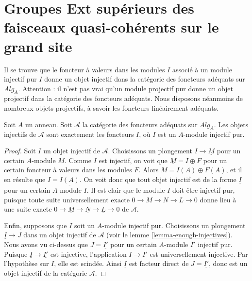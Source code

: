 \section{Groupes Ext supérieurs des faisceaux quasi-cohérents sur le grand site}
\label{section-big}

\noindent
Il se trouve que le foncteur à valeurs dans les modules $\underline{I}$ associé à
un module injectif pur $I$ donne un objet injectif dans la
catégorie des foncteurs adéquats sur $\textit{Alg}_A$.
Attention : il n'est pas vrai qu'un module projectif pur donne
un objet projectif dans la catégorie des foncteurs adéquats. Nous disposons néanmoins
de nombreux objets projectifs, à savoir les foncteurs linéairement adéquats.

\begin{lemma}
\label{lemma-pure-injective-injective-adequate}
Soit $A$ un anneau.
Soit $\mathcal{A}$ la catégorie des foncteurs adéquats sur $\textit{Alg}_A$.
Les objets injectifs de $\mathcal{A}$ sont exactement les foncteurs
$\underline{I}$, où $I$ est un $A$-module injectif pur.
\end{lemma}

\begin{proof}
Soit $I$ un objet injectif de $\mathcal{A}$.
Choisissons un plongement $I \to \underline{M}$ pour un certain $A$-module $M$.
Comme $I$ est injectif, on voit que $\underline{M} = I \oplus F$ pour un certain
foncteur à valeurs dans les modules $F$. Alors $M = I(A) \oplus F(A)$, et il en résulte
que $I = \underline{I(A)}$. On voit donc que tout objet injectif
est de la forme $\underline{I}$ pour un certain $A$-module $I$.
Il est clair que le module $I$ doit être injectif pur,
puisque toute suite universellement exacte $0 \to M \to N \to L \to 0$
donne lieu à une suite exacte
$0 \to \underline{M} \to \underline{N} \to \underline{L} \to 0$
de $\mathcal{A}$.

\medskip\noindent
Enfin, supposons que $I$ soit un
$A$-module injectif pur. Choisissons un plongement $\underline{I} \to J$
dans un objet injectif de $\mathcal{A}$ (voir le
lemme \ref{lemma-enough-injectives}).
Nous avons vu ci-dessus que $J = \underline{I'}$
pour un certain $A$-module $I'$ injectif pur. Puisque
$\underline{I} \to \underline{I'}$ est injective,
l'application $I \to I'$ est universellement injective. Par l'hypothèse sur $I$,
elle est scindée. Ainsi $\underline{I}$ est facteur direct de $J = \underline{I'}$,
donc est un objet injectif de la catégorie $\mathcal{A}$.
\end{proof}

